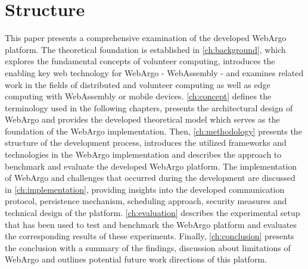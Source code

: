 \section{Structure}
\label{sec:intro:structure}
This paper presents a comprehensive examination of the developed WebArgo platform. The theoretical foundation is established in \autoref{ch:background}, which explores the fundamental concepts of volunteer computing, introduces the enabling key web technology for WebArgo - WebAssembly - and examines related work in the fields of distributed and volunteer computing as well as edge computing with WebAssembly or mobile devices. \autoref{ch:concept} defines the terminology used in the following chapters, presents the architectural design of WebArgo and provides the developed theoretical model which serves as the foundation of the WebArgo implementation. Then, \autoref{ch:methodology} presents the structure of the development process, introduces the utilized frameworks and technologies in the WebArgo implementation and describes the approach to benchmark and evaluate the developed WebArgo platform. The implementation of WebArgo and challenges that occurred during the development are discussed in \autoref{ch:implementation}, providing insights into the developed communication protocol, persistence mechanism, scheduling approach, security measures and technical design of the platform. \autoref{ch:evaluation} describes the experimental setup that has been used to test and benchmark the WebArgo platform and evaluates the corresponding results of these experiments. Finally, \autoref{ch:conclusion} presents the conclusion with a summary of the findings, discussion about limitations of WebArgo and outlines potential future work directions of this platform.